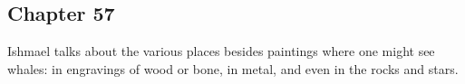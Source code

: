 \subsection{Chapter 57}

Ishmael talks about the various places besides paintings where one might see
whales: in engravings of wood or bone, in metal, and even in the rocks and
stars.
